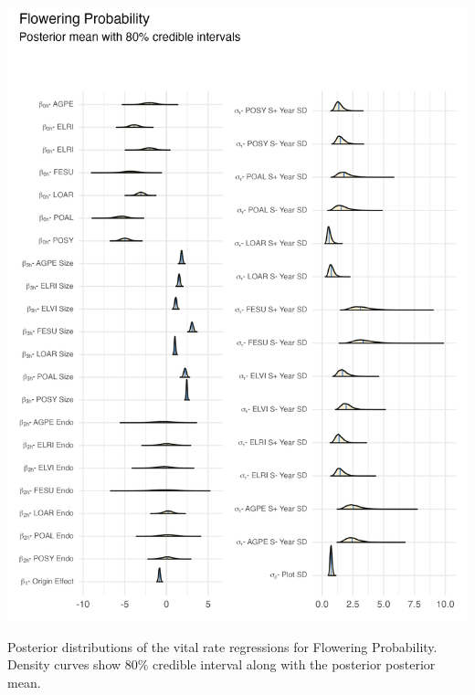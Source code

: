\documentclass[lineno, sn-basic]{sn-jnl}%
\begin{document}
\begin{myfigure}[H]
	\centering
	\includegraphics[width = \linewidth]{flw_posteriors_plot.png}
	\caption[Posterior distributions of the vital rate regressions for Flowering Probability]{Posterior distributions of the vital rate regressions for Flowering Probability. Density curves show $80\%$ credible interval along with the posterior posterior mean.}
\end{myfigure}
\end{document}
